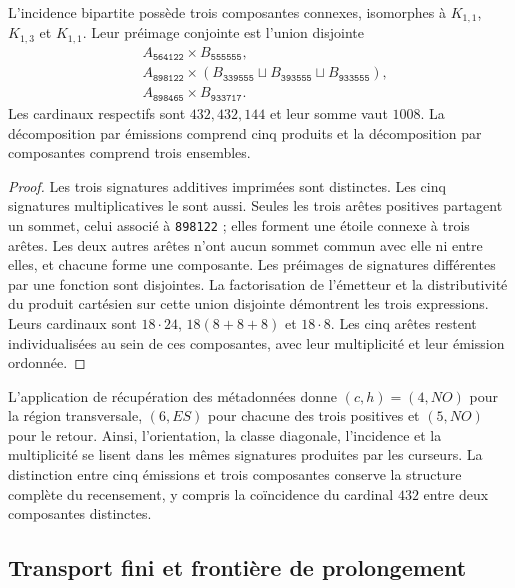 \begin{theorem}
L'incidence bipartite possède trois composantes connexes, isomorphes à
$K_{1,1}$, $K_{1,3}$ et $K_{1,1}$. Leur préimage conjointe est l'union
disjointe
\begin{align*}
 &A_{\texttt{564122}}\times B_{\texttt{555555}},\\
 &A_{\texttt{898122}}\times
  (B_{\texttt{339555}}\sqcup B_{\texttt{393555}}
     \sqcup B_{\texttt{933555}}),\\
 &A_{\texttt{898465}}\times B_{\texttt{933717}}.
\end{align*}
Les cardinaux respectifs sont $432,432,144$ et leur somme vaut $1008$.
La décomposition par émissions comprend cinq produits et la
décomposition par composantes comprend trois ensembles.
\end{theorem}
\begin{proof}
Les trois signatures additives imprimées sont distinctes. Les cinq signatures
multiplicatives le sont aussi. Seules les trois arêtes positives partagent
un sommet, celui associé à \texttt{898122} ; elles forment une étoile connexe
à trois arêtes. Les deux autres arêtes n'ont aucun sommet commun avec
elle ni entre elles, et chacune forme une composante. Les préimages de
signatures différentes par une fonction sont disjointes. La factorisation de
l'émetteur et la distributivité du produit cartésien sur cette union
disjointe démontrent les trois expressions. Leurs cardinaux sont
$18\cdot24$, $18(8+8+8)$ et $18\cdot8$. Les cinq arêtes restent
individualisées au sein de ces composantes, avec leur multiplicité et leur
émission ordonnée.
\end{proof}

L'application de récupération des métadonnées donne $(c,h)=(4,NO)$ pour la région transversale,
$(6,ES)$ pour chacune des trois positives et $(5,NO)$ pour le retour.
Ainsi, l'orientation, la classe diagonale, l'incidence et la multiplicité se lisent dans
les mêmes signatures produites par les curseurs. La distinction entre cinq
émissions et trois composantes conserve la structure complète du recensement,
y compris la coïncidence du cardinal $432$ entre deux composantes distinctes.

\subsection{Transport fini et frontière de prolongement}

